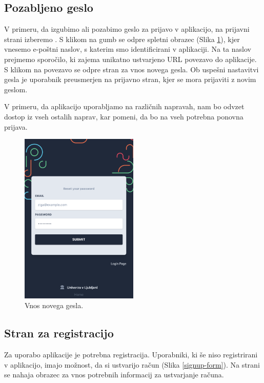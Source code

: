\documentclass[a4paper, 12pt]{book}
\begin{document}
\subsection{Pozabljeno geslo}
\label{forgotten-form}
V primeru, da izgubimo ali pozabimo geslo za prijavo v aplikacijo, na prijavni strani izberemo . S klikom na gumb se odpre spletni obrazec (Slika \ref{password-reset-form}), kjer vnesemo e-poštni naslov, s katerim smo identificirani v aplikaciji. Na ta naslov prejmemo sporočilo, ki zajema unikatno ustvarjeno URL povezavo do aplikacije. S klikom na povezavo se odpre stran za vnos novega gesla. Ob uspešni nastavitvi gesla je uporabnik preusmerjen na prijavno stran, kjer se mora prijaviti z novim geslom. 

V primeru, da aplikacijo uporabljamo na različnih napravah, nam bo odvzet dostop iz vseh ostalih naprav, kar pomeni, da bo na vseh potrebna ponovna prijava.

\begin{figure}[h]
\begin{center}
\includegraphics[width=0.5\textwidth]{slike/reset_password.png}
\end{center}
\caption{ Vnos novega gesla. }
\label{password-reset-form}
\end{figure}

\subsection{Stran za registracijo }
\label{registration-page}
Za uporabo aplikacije je potrebna registracija. Uporabniki, ki še niso registrirani v aplikacijo, imajo možnost, da si ustvarijo račun (Slika \ref{signup-form}). Na strani se nahaja obrazec za vnos potrebnih informacij za ustvarjanje računa.
\end{document}
